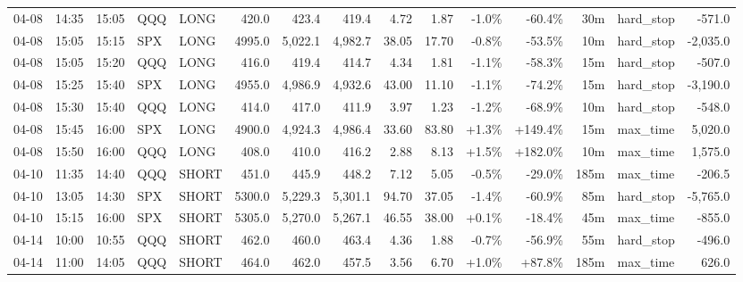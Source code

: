 \documentclass[11pt,a4paper,twoside]{article}
\begin{document}
\begin{landscape}
\begin{center}
\begin{longtable}{>{\color{txtmain}}l l l l l r r r r r r r r >{\color{txtmain}}l r}
04-08 & 14:35 & 15:05 & QQQ & LONG & 420.0 & 423.4 & 419.4 & 4.72 & 1.87 & \textcolor{lossred}{-1.0\%} & \textcolor{lossred}{-60.4\%} & 30m & hard\_stop & \textcolor{lossred}{-571.0} \\
04-08 & 15:05 & 15:15 & SPX & LONG & 4995.0 & 5,022.1 & 4,982.7 & 38.05 & 17.70 & \textcolor{lossred}{-0.8\%} & \textcolor{lossred}{-53.5\%} & 10m & hard\_stop & \textcolor{lossred}{-2,035.0} \\
04-08 & 15:05 & 15:20 & QQQ & LONG & 416.0 & 419.4 & 414.7 & 4.34 & 1.81 & \textcolor{lossred}{-1.1\%} & \textcolor{lossred}{-58.3\%} & 15m & hard\_stop & \textcolor{lossred}{-507.0} \\
04-08 & 15:25 & 15:40 & SPX & LONG & 4955.0 & 4,986.9 & 4,932.6 & 43.00 & 11.10 & \textcolor{lossred}{-1.1\%} & \textcolor{lossred}{-74.2\%} & 15m & hard\_stop & \textcolor{lossred}{-3,190.0} \\
04-08 & 15:30 & 15:40 & QQQ & LONG & 414.0 & 417.0 & 411.9 & 3.97 & 1.23 & \textcolor{lossred}{-1.2\%} & \textcolor{lossred}{-68.9\%} & 10m & hard\_stop & \textcolor{lossred}{-548.0} \\
04-08 & 15:45 & 16:00 & SPX & LONG & 4900.0 & 4,924.3 & 4,986.4 & 33.60 & 83.80 & \textcolor{wingreen}{+1.3\%} & \textcolor{wingreen}{+149.4\%} & 15m & max\_time & \textcolor{wingreen}{5,020.0} \\
04-08 & 15:50 & 16:00 & QQQ & LONG & 408.0 & 410.0 & 416.2 & 2.88 & 8.13 & \textcolor{wingreen}{+1.5\%} & \textcolor{wingreen}{+182.0\%} & 10m & max\_time & \textcolor{wingreen}{1,575.0} \\
04-10 & 11:35 & 14:40 & QQQ & SHORT & 451.0 & 445.9 & 448.2 & 7.12 & 5.05 & \textcolor{lossred}{-0.5\%} & \textcolor{lossred}{-29.0\%} & 185m & max\_time & \textcolor{lossred}{-206.5} \\
04-10 & 13:05 & 14:30 & SPX & SHORT & 5300.0 & 5,229.3 & 5,301.1 & 94.70 & 37.05 & \textcolor{lossred}{-1.4\%} & \textcolor{lossred}{-60.9\%} & 85m & hard\_stop & \textcolor{lossred}{-5,765.0} \\
04-10 & 15:15 & 16:00 & SPX & SHORT & 5305.0 & 5,270.0 & 5,267.1 & 46.55 & 38.00 & \textcolor{wingreen}{+0.1\%} & \textcolor{lossred}{-18.4\%} & 45m & max\_time & \textcolor{lossred}{-855.0} \\
04-14 & 10:00 & 10:55 & QQQ & SHORT & 462.0 & 460.0 & 463.4 & 4.36 & 1.88 & \textcolor{lossred}{-0.7\%} & \textcolor{lossred}{-56.9\%} & 55m & hard\_stop & \textcolor{lossred}{-496.0} \\
04-14 & 11:00 & 14:05 & QQQ & SHORT & 464.0 & 462.0 & 457.5 & 3.56 & 6.70 & \textcolor{wingreen}{+1.0\%} & \textcolor{wingreen}{+87.8\%} & 185m & max\_time & \textcolor{wingreen}{626.0} \\

\end{longtable}
\end{center}
\end{landscape}
\end{document}
